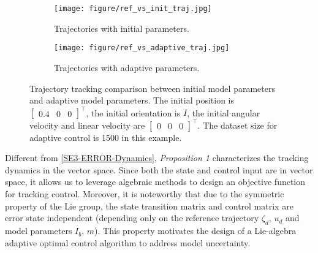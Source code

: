 \documentclass[lettersize,journal]{IEEEtran}
\begin{document}
\begin{figure*}[t]
    \centering
    \begin{subfigure}{0.5\textwidth}
        \texttt{[image: figure/ref\_vs\_init\_traj.jpg]}
        
        \caption{Trajectories with initial parameters.}
       
    \end{subfigure}%
    \begin{subfigure}{0.5\textwidth}
        \texttt{[image: figure/ref\_vs\_adaptive\_traj.jpg]}
        \caption{Trajectories with adaptive parameters.}
      
    \end{subfigure}%

    \caption{Trajectory tracking comparison between initial model parameters and adaptive model parameters. The initial position is $\begin{bmatrix}
        0.4 & 0 & 0
    \end{bmatrix}^{\top}$, the initial orientation is $I$, the initial angular velocity and linear velocity are $\begin{bmatrix}
        0 & 0 & 0
    \end{bmatrix}^{\top}$. The dataset size for adaptive control is 1500 in this example.}
    \label{fig:initial-adaptive-comparison}
\end{figure*}

Different from \eqref{SE3-ERROR-Dynamics}, \textit{Proposition 1} characterizes the tracking dynamics in the vector space. Since both the state and control input are in vector space, it allows us to leverage algebraic methods to design an objective function for tracking control. Moreover, it is noteworthy that due to the symmetric property of the Lie group, the state transition matrix and control matrix are error state independent (depending only on the reference trajectory $\zeta_d$, $u_d$ and model parameters $I_b$, $m$). This property motivates the design of a Lie-algebra adaptive optimal control algorithm to address model uncertainty.
\end{document}
